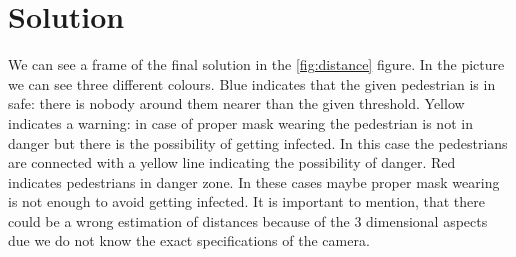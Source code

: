 
\chapter{Solution}

We can see a frame of the final solution in the \ref{fig:distance} figure. In the picture we can see three different colours. Blue indicates that the given pedestrian is in safe: there is nobody around them nearer than the given threshold. Yellow indicates a warning: in case of proper mask wearing the pedestrian is not in danger but there is the possibility of getting infected. In this case the pedestrians are connected with a yellow line indicating the possibility of danger. Red indicates pedestrians in danger zone. In these cases maybe proper mask wearing is not enough to avoid getting infected. It is important to mention, that there could be a wrong estimation of distances because of the 3 dimensional aspects due we do not know the exact specifications of the camera.

